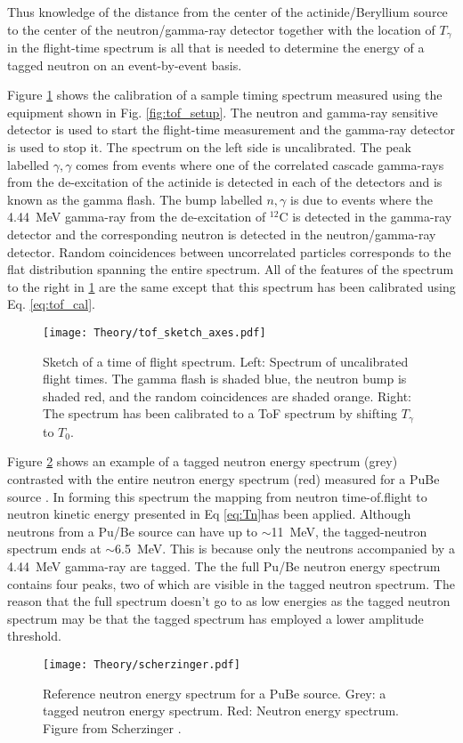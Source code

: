 \documentclass[main.tex]{subfiles}
\begin{document}
Thus knowledge of the distance from the center of the actinide/Beryllium source to the center of the neutron/gamma-ray detector together with the location of $T_\gamma$ in the flight-time spectrum is all that is needed to determine the energy of a tagged neutron on an event-by-event basis.

Figure \ref{fig:tof_sketch} shows the calibration of a sample timing spectrum measured using the equipment shown in Fig. \ref{fig:tof_setup}. The neutron and gamma-ray sensitive detector is used to start the flight-time measurement and the gamma-ray detector is used to stop it. The spectrum on the left side is uncalibrated. The peak labelled $\gamma,\gamma$ comes from events where one of the correlated cascade gamma-rays from the de-excitation of the actinide is detected in each of the detectors and is known as the gamma flash. The bump labelled $n,\gamma$ is due to events where the \SI{4.44}{\MeV} gamma-ray from the de-excitation of $^{12}$C is detected in the gamma-ray detector and the corresponding neutron is detected in the neutron/gamma-ray detector. Random coincidences between uncorrelated particles corresponds to the flat distribution spanning the entire spectrum.
All of the features of the spectrum to the right in \ref{fig:tof_sketch} are the same except that this spectrum has been calibrated using Eq. \ref{eq:tof_cal}.

\begin{figure}[t]
    \centering
        \texttt{[image: Theory/tof\_sketch\_axes.pdf]}
        \caption[Sketch of a time of flight spectrum.]{Sketch of a time of flight spectrum. Left: Spectrum of uncalibrated flight times. The gamma flash is shaded blue, the neutron bump is shaded red, and the random coincidences are shaded orange. Right: The spectrum has been calibrated to a ToF spectrum by shifting $T_\gamma$ to $T_0$.}
    \label{fig:tof_sketch} 
\end{figure}
Figure \ref{fig:scherzinger} shows an example of a tagged neutron energy spectrum (grey) contrasted with the entire neutron energy spectrum (red) measured for a PuBe source \cite{ScherzingerPhd}. In forming this spectrum the mapping from neutron time-of.flight to neutron kinetic energy presented in Eq \ref{eq:Tn}has been applied. Although neutrons from a Pu/Be source can have up to $\sim$\SI{11}{\MeV}, the tagged-neutron spectrum ends at $\sim$\SI{6.5}{\MeV}. This is because only the neutrons accompanied by a \SI{4.44}{\MeV} gamma-ray are tagged. The the full Pu/Be neutron energy spectrum contains four peaks, two of which are visible in the tagged neutron spectrum. The reason that the full spectrum doesn't go to as low energies as the tagged neutron spectrum may be that the tagged spectrum has employed a lower amplitude threshold.
\begin{figure}[t]
    \centering
        \texttt{[image: Theory/scherzinger.pdf]}
        \caption[Reference neutron energy spectrum]{Reference neutron energy spectrum for a PuBe source. Grey: a tagged neutron energy spectrum. Red: Neutron energy spectrum. Figure from Scherzinger \cite{ScherzingerPhd}.}
    \label{fig:scherzinger} 
\end{figure}
\end{document}
